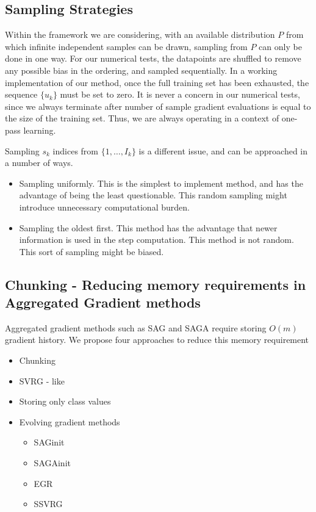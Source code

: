 \documentclass[11pt]{article}
\begin{document}
\subsection{Sampling Strategies}

Within the framework we are considering, with an available distribution $P$ from which infinite independent samples can be drawn, sampling from $P$ can only be done in one way. For our numerical tests, the datapoints are shuffled to remove any possible bias in the ordering, and sampled sequentially. In a working implementation of our method, once the full training set has been exhausted, the sequence $\{u_k\}$ must be set to zero. It is never a concern in our numerical tests, since we always terminate after number of sample gradient evaluations is equal to the size of the training set. Thus, we are always operating in a context of one-pass learning.

Sampling $s_k$ indices from $\{ 1, \ldots ,I_k\}$ is a different issue, and can be approached in a number of ways. 

\begin{itemize}
	\item Sampling uniformly. This is the simplest to implement method, and has the advantage of being the least questionable. This random sampling might introduce unnecessary computational burden.
	\item Sampling the oldest first. This method has the advantage that newer information is used in the step computation. This method is not random. This sort of sampling might be biased. 
\end{itemize}

\subsection{Chunking - Reducing memory requirements in Aggregated Gradient methods}

Aggregated gradient methods such as SAG and SAGA require storing $O(m)$ gradient history. We propose four approaches to reduce this memory requirement
\begin{itemize}
	\item Chunking
	\item SVRG - like
	\item Storing only class values
	\item Evolving gradient methods
		  \begin{itemize}
		  	\item SAGinit
		  	\item SAGAinit
		  	\item EGR
		  	\item SSVRG
		  \end{itemize}
\end{itemize}
\end{document}
